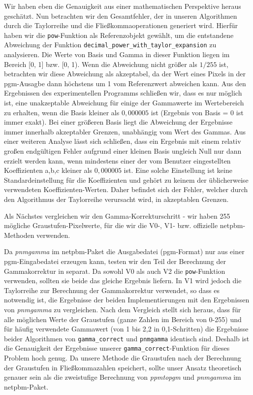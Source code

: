 \documentclass[course=erap]{aspdoc}
\begin{document}
\par
Wir haben eben die Genauigkeit aus einer mathematischen Perspektive heraus geschätzt. Nun betrachten wir den Gesamtfehler, der in unseren Algorithmen durch die Taylorreihe und die Fließkommaoperationen generiert wird. Hierfür haben wir die \texttt{pow}-Funktion als Referenzobjekt gewählt, um die entstandene Abweichung der Funktion \texttt{decimal\_power\_with\_taylor\_expansion} zu analysieren. Die Werte von Basis und Gamma in dieser Funktion liegen im Bereich [0, 1] bzw. [0, 1). Wenn die Abweichung nicht größer als $1/255$ ist, betrachten wir diese Abweichung als akzeptabel, da der Wert eines Pixels in der pgm-Ausagbe dann höchstens um 1 vom Referenzwert abweichen kann. Aus den Ergebnissen des experimentellen Programms schließen wir, dass es nur möglich ist, eine unakzeptable Abweichung für einige der Gammawerte im Wertebereich zu erhalten, wenn die Basis kleiner als $0,000005$ ist (Ergebnis von Basis = 0 ist immer exakt). Bei einer größeren Basis liegt die Abweichung der Ergebnisse immer innerhalb akzeptabler Grenzen, unabhängig vom Wert des Gammas. Aus einer weiteren Analyse lässt sich schließen, dass ein Ergebnis mit einem relativ großen endgültigen Fehler aufgrund einer kleinen Basis ungleich Null nur dann erzielt werden kann, wenn mindestens einer der vom Benutzer eingestellten Koeffizienten a,b,c kleiner als $0,000005$ ist. Eine solche Einstellung ist keine Standardeinstellung für die Koeffizienten und gehört zu keinem der üblicherweise verwendeten Koeffizienten-Werten. Daher befindet sich der Fehler, welcher durch den Algorithmus der Taylorreihe verursacht wird, in akzeptablen Grenzen.

\par
Als Nächstes vergleichen wir den Gamma-Korrekturschritt - wir haben 255 mögliche Graustufen-Pixelwerte, für die wir die V0-, V1- bzw. offizielle netpbm-Methoden verwenden.

\par
Da \textit{pnmgamma} im netpbm-Paket die Ausgabedatei (pgm-Format) nur aus einer pgm-Eingabedatei erzeugen kann, testen wir den Teil der Berechnung der Gammakorrektur in  separat. Da sowohl V0 als auch V2 die \texttt{pow}-Funktion verwenden, sollten sie beide das gleiche Ergebnis liefern. In V1 wird jedoch die Taylorreihe zur Berechnung der Gammakorrektur verwendet, so dass es notwendig ist, die Ergebnisse der beiden Implementierungen mit den Ergebnissen von \textit{pnmgamma} zu vergleichen. Nach dem Vergleich stellt sich heraus, dass für alle möglichen Werte der Graustufen (ganze Zahlen im Bereich von 0-255) und für häufig verwendete Gammawert (von 1 bis 2,2 in 0,1-Schritten) die Ergebnisse beider Algorithmen von \texttt{gamma\_correct} und \texttt{pnmgamma} identisch sind. Deshalb ist die Genauigkeit der Ergebnisse unserer \texttt{gamma\_correct}-Funktion für dieses Problem hoch genug. Da unsere Methode die Graustufen nach der Berechnung der Graustufen in Fließkommazahlen speichert, sollte unser Ansatz theoretisch genauer sein als die zweistufige Berechnung von \textit{ppmtopgm} und \textit{pnmgamma} im netpbm-Paket.
\end{document}
